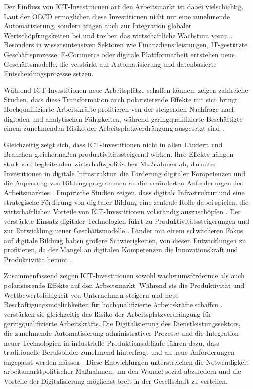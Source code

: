 Der Einfluss von \ac{ICT}-Investitionen auf den Arbeitsmarkt ist dabei vielschichtig. Laut der 
\ac{OECD} ermöglichen diese Investitionen nicht nur eine zunehmende Automatisierung, sondern 
tragen auch zur Integration globaler Wertschöpfungsketten bei und treiben das wirtschaftliche 
Wachstum voran \parencite[vgl.][S. 228-229]{oecd2019measuring}. Besonders in wissensintensiven 
Sektoren wie Finanzdienstleistungen, \ac{IT}-gestützte Geschäftsprozesse, E-Commerce oder 
digitale Plattformarbeit entstehen neue Geschäftsmodelle, die verstärkt auf Automatisierung und 
datenbasierte Entscheidungsprozesse setzen.

Während \ac{ICT}-Investitionen neue Arbeitsplätze schaffen können, zeigen zahlreiche 
Studien, dass diese Transformation auch polarisierende Effekte mit sich bringt. 
Hochqualifizierte Arbeitskräfte profitieren von der steigenden Nachfrage nach digitalen 
und analytischen Fähigkeiten, während geringqualifizierte Beschäftigte einem zunehmenden 
Risiko der Arbeitsplatzverdrängung ausgesetzt sind 
\parencite[vgl.][S. 48–52]{brynjolfsson2014thesecond}.

Gleichzeitig zeigt sich, dass \ac{ICT}-Investitionen nicht in allen Ländern und Branchen 
gleichermaßen produktivitätssteigernd wirken. Ihre Effekte hängen stark von begleitenden 
wirtschaftspolitischen Maßnahmen ab, darunter Investitionen in digitale Infrastruktur, 
die Förderung digitaler Kompetenzen und die Anpassung von Bildungsprogrammen an die 
veränderten Anforderungen des Arbeitsmarktes 
\parencite[vgl.][S. 230–234]{brynjolfsson2014thesecond}. Empirische Studien zeigen, dass digitale 
Infrastruktur und eine strategische Förderung von digitaler Bildung eine zentrale Rolle dabei 
spielen, die wirtschaftlichen Vorteile von \ac{ICT}-Investitionen vollständig auszuschöpfen 
\parencite[vgl.][S. 357–358]{vu2011ict}. Der verstärkte Einsatz digitaler Technologien führt zu 
Produktivitätssteigerungen und zur Entwicklung neuer Geschäftsmodelle 
\parencite[vgl.][S. 361–362]{vu2011ict}. 
Länder mit einem schwächeren Fokus auf digitale Bildung haben größere Schwierigkeiten, von diesen 
Entwicklungen zu profitieren, da der Mangel an digitalen Kompetenzen die Innovationskraft und 
Produktivität hemmt \parencite[vgl.][S. 122–124]{oecd2020digital}.

Zusammenfassend zeigen \ac{ICT}-Investitionen sowohl wachstumsfördernde als auch 
polarisierende Effekte auf den Arbeitsmarkt. Während sie die Produktivität und 
Wettbewerbsfähigkeit von Unternehmen steigern und neue Beschäftigungsmöglichkeiten für 
hochqualifizierte Arbeitskräfte schaffen \parencite[vgl.][S. 19–20]{oecd2020digital}, 
verstärken sie gleichzeitig das Risiko der Arbeitsplatzverdrängung für geringqualifizierte 
Arbeitskräfte. Die Digitalisierung des Dienstleistungssektors, die zunehmende Automatisierung 
administrativer Prozesse und die Integration neuer Technologien in industrielle 
Produktionsabläufe führen dazu, dass traditionelle Berufsbilder zunehmend hinterfragt und 
an neue Anforderungen angepasst werden müssen \parencite[vgl.][S. 20]{oecd2020digital}. Diese 
Entwicklungen unterstreichen die Notwendigkeit arbeitsmarktpolitischer Maßnahmen, um den 
Wandel sozial abzufedern und die Vorteile der Digitalisierung möglichst breit in der 
Gesellschaft zu verteilen.

